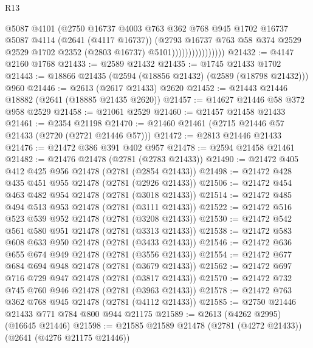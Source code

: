 \begin{lexlean}{R13}
\begin{coremodule}
                                @5087
                                @4101
                                (@2750
                                  @16737
                                  @4003
                                  @763
                                  @362
                                  @768
                                  @945
                                  @1702
                                  @16737
                                  @5087
                                  @4114
                                  (@2641 (@4117 @16737))
                                  (@2793
                                    @16737
                                    @763
                                    @58
                                    @374
                                    @2529
                                    @2529
                                    @1702
                                    @2352
                                    (@2803 @16737)
                                    @5101))))))))))))))))
@21432 := @4147 @2160 @1768
@21433 := @2589 @21432
@21435 := @1745 @21433 @1702
@21443 := @18866 @21435 (@2594 (@18856 @21432) (@2589 (@18798 @21432))) @960
@21446 := @2613 (@2617 @21433) @2620
@21452 := @21443 @21446 @18882 (@2641 (@18885 @21435 @2620))
@21457 := @14627 @21446 @58 @372 @958 @2529
@21458 := @21061 @2529
@21460 := @21457 @21458 @21433
@21461 := @2354 @21198
@21470 := @21460 @21461 (@2715 @21446 @57 @21433 (@2720 (@2721 @21446 @57)))
@21472 := @2813 @21446 @21433
@21476 := @21472 @386 @391 @402 @957
@21478 := @2594 @21458 @21461
@21482 := @21476 @21478 (@2781 (@2783 @21433))
@21490 := @21472 @405 @412 @425 @956 @21478 (@2781 (@2854 @21433))
@21498 := @21472 @428 @435 @451 @955 @21478 (@2781 (@2926 @21433))
@21506 := @21472 @454 @463 @482 @954 @21478 (@2781 (@3018 @21433))
@21514 := @21472 @485 @494 @513 @953 @21478 (@2781 (@3111 @21433))
@21522 := @21472 @516 @523 @539 @952 @21478 (@2781 (@3208 @21433))
@21530 := @21472 @542 @561 @580 @951 @21478 (@2781 (@3313 @21433))
@21538 := @21472 @583 @608 @633 @950 @21478 (@2781 (@3433 @21433))
@21546 := @21472 @636 @655 @674 @949 @21478 (@2781 (@3556 @21433))
@21554 := @21472 @677 @684 @694 @948 @21478 (@2781 (@3679 @21433))
@21562 := @21472 @697 @716 @729 @947 @21478 (@2781 (@3817 @21433))
@21570 := @21472 @732 @745 @760 @946 @21478 (@2781 (@3963 @21433))
@21578 := @21472 @763 @362 @768 @945 @21478 (@2781 (@4112 @21433))
@21585 := @2750 @21446 @21433 @771 @784 @800 @944 @21175
@21589 := @2613 (@4262 @2995) (@16645 @21446)
@21598 := @21585 @21589 @21478 (@2781 (@4272 @21433)) (@2641 (@4276 @21175 @21446))

\end{coremodule}
\end{lexlean}
